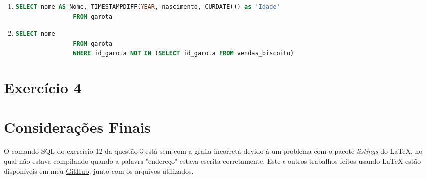 \documentclass{article}
\begin{document}
\begin{enumerate}[label=\alph*.]
\begin{enumerate}[label=\roman*., labelsep=0.5em, leftmargin=*]
        \item 
        \begin{adjustwidth}{1em}{0pt}
            \begin{lstlisting}[language=SQL]
                SELECT nome AS Nome, TIMESTAMPDIFF(YEAR, nascimento, CURDATE()) as 'Idade'
                FROM garota
            \end{lstlisting}
        \end{adjustwidth}

        \item 
        \begin{adjustwidth}{1em}{0pt}
            \begin{lstlisting}[language=SQL]
                SELECT nome
                FROM garota
                WHERE id_garota NOT IN (SELECT id_garota FROM vendas_biscoito)
            \end{lstlisting}
        \end{adjustwidth}

    \end{enumerate}

\end{enumerate}

\section*{Exercício 4}


\section*{Considerações Finais}
\paragraph{} O comando SQL do exercício 12 da questão 3 está sem com a grafia incorreta devido à um problema com o pacote \textit{listings} do \LaTeX{}, no qual não estava compilando quando a palavra "endereço" estava escrita corretamente. Este e outros trabalhos feitos usando \LaTeX{}  estão disponíveis em meu \href{https://github.com/gpgp2006/LaTeX}{GitHub}, junto com os arquivos utilizados.
\end{document}
